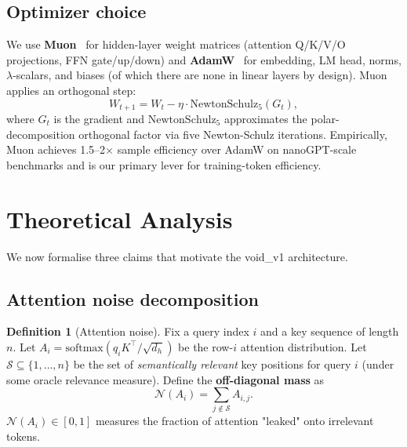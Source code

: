 \documentclass[11pt,a4paper]{article}
\theoremstyle{definition}
\newtheorem{definition}{Definition}
\theoremstyle{remark}
\newcommand{\softmax}{\mathrm{softmax}}
\begin{document}
\subsection{Optimizer choice}
\label{sec:optim}

We use \textbf{Muon}~\citep{jordan2024muon} for hidden-layer weight
matrices (attention Q/K/V/O projections, FFN gate/up/down) and
\textbf{AdamW}~\citep{loshchilov2019adamw} for embedding, LM head, norms,
$\lambda$-scalars, and biases (of which there are none in linear layers
by design). Muon applies an orthogonal step:
\begin{equation}
W_{t+1} = W_t - \eta \cdot \mathrm{NewtonSchulz}_5(G_t),
\end{equation}
where $G_t$ is the gradient and $\mathrm{NewtonSchulz}_5$ approximates
the polar-decomposition orthogonal factor via five Newton-Schulz
iterations. Empirically, Muon achieves 1.5--2$\times$ sample efficiency
over AdamW on nanoGPT-scale benchmarks and is our primary lever for
training-token efficiency.

\section{Theoretical Analysis}
\label{sec:theory}

We now formalise three claims that motivate the void\_v1 architecture.

\subsection{Attention noise decomposition}

\begin{definition}[Attention noise]
Fix a query index $i$ and a key sequence of length $n$. Let
$A_i = \softmax(q_i K^\top / \sqrt{d_h})$ be the row-$i$ attention
distribution. Let $\mathcal{S} \subseteq \{1,\dots,n\}$ be the set of
\emph{semantically relevant} key positions for query $i$
(under some oracle relevance measure). Define the \textbf{off-diagonal
mass} as
\begin{equation}
\mathcal{N}(A_i) = \sum_{j \notin \mathcal{S}} A_{i,j}.
\end{equation}
$\mathcal{N}(A_i) \in [0, 1]$ measures the fraction of attention
"leaked" onto irrelevant tokens.
\end{definition}
\end{document}
